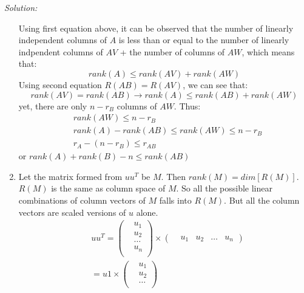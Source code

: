 \documentclass[fleqn]{article}
\newenvironment{solution}
    {\textit{Solution:}}
    {}
\begin{document}
\begin{solution}
\begin{enumerate}[label=(\alph*)]
    Using first equation above, it can be observed that the number of linearly independent columns of $A$ is less than or equal to the number of linearly indpendent columns of $AV$ + the number of columns of $AW$, which means that:
    \begin{equation*}
        rank(A) \leq rank(AV) + rank(AW)
    \end{equation*}
    Using second equation $R(AB) = R(AV)$, we can see that:
    \begin{equation*}
        rank(AV) = rank(AB) \rightarrow rank(A) \leq rank(AB) + rank(AW)
    \end{equation*}
    yet, there are only $n - r_B$ columns of $AW$. Thus:
    \begin{equation*}
        \begin{split}
            &rank(AW) \leq n - r_B\\
            &rank(A) - rank(AB) \leq rank(AW) \leq n - r_B\\
            & r_A - (n - r_B) \leq r_{AB}
        \end{split}
    \end{equation*}
    or $ rank(A) + rank(B) -n \leq rank(AB)$
    \item Let the matrix formed from $uu^{T}$ be $M$. Then $rank(M) = dim[R(M)]$. $R(M)$ is the same as column space of $M$. So all the possible linear combinations of column vectors of $M$ falls into $R(M)$. But all the column vectors are scaled versions of $u$ alone.
    \begin{equation*}
        \begin{split}
              &uu^{T} = \begin{pmatrix}
                  &u_1\\
                  &u_2\\
                  &\dots\\
                  &u_n\\
              \end{pmatrix} \times \begin{pmatrix}
                  &u_1 &u_2 &\dots &u_n
              \end{pmatrix}\\
              &= u1 \times \begin{pmatrix}
                    &u_1\\                 
                    &u_2\\                 
                    &\dots\\                 

\end{pmatrix}
\end{split}
\end{equation*}
\end{enumerate}
\end{solution}
\end{document}
